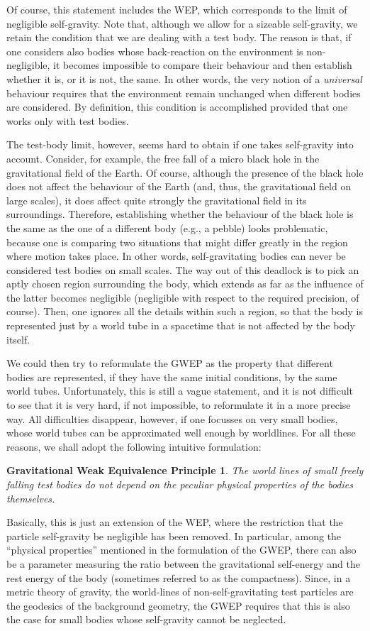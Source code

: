 \documentclass[a4paper,showkeys,aps,prd,reprint,nofootinbib,showpacs,twocolumn]{revtex4-1}
\theoremstyle{plain}
\newtheorem*{GWEP}{Gravitational Weak Equivalence Principle}
\begin{document}
Of course, this statement includes the WEP, which corresponds to the limit of negligible self-gravity.  Note that, although we allow for a sizeable self-gravity, we retain the condition that we are dealing with a test body.  The reason is that, if one considers also bodies whose back-reaction on the environment is non-negligible, it becomes impossible to compare their behaviour and then establish whether it is, or it is not, the same.  In other words, the very notion of a \emph{universal} behaviour requires that the environment remain unchanged when different bodies are considered.  By definition, this condition is accomplished provided that one works only with test bodies.

The test-body limit, however, seems hard to obtain if one takes self-gravity into account.  Consider, for example, the free fall of a micro black hole in the gravitational field of the Earth.  Of course, although the presence of the black hole does not affect the behaviour of the Earth (and, thus, the gravitational field on large scales), it does affect quite strongly the gravitational field in its surroundings.  Therefore, establishing whether the behaviour of the black hole is the same as the one of a different body (e.g., a pebble) looks problematic, because one is comparing two situations that might differ greatly in the region where motion takes place.  In other words, self-gravitating bodies can never be considered test bodies on small scales.  The way out of this deadlock is to pick an aptly chosen region surrounding the body, which extends as far as the influence of the latter becomes negligible (negligible with respect to the required precision, of course).  Then, one ignores all the details within such a region, so that the body is represented just by a world tube in a spacetime that is not affected by the body itself.

We could then try to reformulate the GWEP as the property that different bodies are represented, if they have the same initial conditions, by the same world tubes.  Unfortunately, this is still a vague statement, and it is not difficult to see that it is very hard, if not impossible, to reformulate it in a more precise way.  All difficulties disappear, however, if one focusses on very small bodies, whose world tubes can be approximated well enough by worldlines.  For all these reasons, we shall adopt the following intuitive formulation:
%
\begin{GWEP} 
The world lines of small freely falling test bodies do not depend on the peculiar physical properties of the bodies themselves.
\end{GWEP}
%
Basically, this is just an extension of the WEP, where the restriction that the particle self-gravity be negligible has been removed.  In particular, among the ``physical properties'' mentioned in the formulation of the GWEP, there can also be a parameter measuring the ratio between the gravitational self-energy and the rest energy of the body (sometimes referred to as the compactness).  Since, in a metric theory of gravity, the world-lines of non-self-gravitating test particles are the geodesics of the background geometry, the GWEP requires that this is also the case for small bodies whose self-gravity cannot be neglected.
\end{document}

